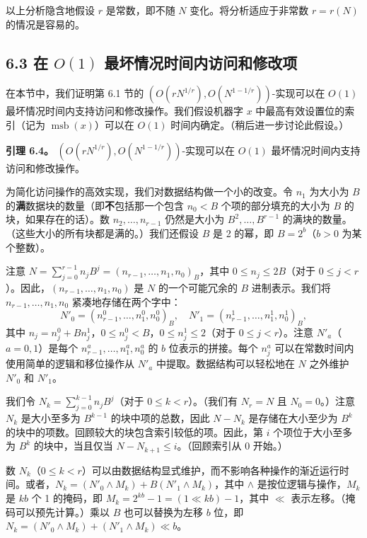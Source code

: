 \documentclass[12pt,a4paper]{ctexart}
\theoremstyle{remark}
\DeclareMathOperator{\msb}{msb}
\begin{document}
以上分析隐含地假设 $r$ 是常数，即不随 $N$ 变化。将分析适应于非常数 $r=r(N)$ 的情况是容易的。

\subsection{6.3 在 $O(1)$ 最坏情况时间内访问和修改项}

在本节中，我们证明第 6.1 节的 $(O(rN^{1/r}),O(N^{1-1/r}))$-实现可以在 $O(1)$ 最坏情况时间内支持访问和修改操作。我们假设机器字 $x$ 中最高有效设置位的索引（记为 $\msb(x)$）可以在 $O(1)$ 时间内确定。（稍后进一步讨论此假设。）

\textbf{引理 6.4。} $(O(rN^{1/r}),O(N^{1-1/r}))$-实现可以在 $O(1)$ 最坏情况时间内支持访问和修改操作。

为简化访问操作的高效实现，我们对数据结构做一个小的改变。令 $n_1$ 为大小为 $B$ 的\textbf{满}数据块的数量（即\textbf{不}包括那一个包含 $n_0<B$ 个项的部分填充的大小为 $B$ 的块，如果存在的话）。数 $n_2,\ldots,n_{r-1}$ 仍然是大小为 $B^2,\ldots,B^{r-1}$ 的满块的数量。（这些大小的所有块都是满的。）我们还假设 $B$ 是 2 的幂，即 $B=2^b$（$b>0$ 为某个整数）。

注意 $N=\sum_{j=0}^{r-1} n_j B^j = (n_{r-1},\ldots,n_1,n_0)_B$，其中 $0\leq n_j\leq 2B$（对于 $0\leq j<r$）。因此，$(n_{r-1},\ldots,n_1,n_0)$ 是 $N$ 的一个可能冗余的 $B$ 进制表示。我们将 $n_{r-1},\ldots,n_1,n_0$ 紧凑地存储在两个字中：
$$N'_0 = (n^0_{r-1},\ldots,n^0_1,n^0_0)_B, \quad N'_1 = (n^1_{r-1},\ldots,n^1_1,n^1_0)_B,$$
其中 $n_j = n^0_j + B n^1_j$，$0\leq n^0_j < B$，$0\leq n^1_j \leq 2$（对于 $0\leq j<r$）。注意 $N'_a$（$a=0,1$）是每个 $n^a_{r-1},\ldots,n^a_1,n^a_0$ 的 $b$ 位表示的拼接。每个 $n^a_j$ 可以在常数时间内使用简单的逻辑和移位操作从 $N'_a$ 中提取。数据结构可以轻松地在 $N$ 之外维护 $N'_0$ 和 $N'_1$。

我们令 $N_k = \sum_{j=0}^{k-1} n_j B^j$（对于 $0\leq k<r$）。（我们有 $N_r=N$ 且 $N_0=0$。）注意 $N_k$ 是大小至多为 $B^{k-1}$ 的块中项的总数，因此 $N-N_k$ 是存储在大小至少为 $B^k$ 的块中的项数。回顾较大的块包含索引较低的项。因此，第 $i$ 个项位于大小至多为 $B^k$ 的块中，当且仅当 $N-N_{k+1}\leq i$。（回顾索引从 0 开始。）

数 $N_k$（$0\leq k<r$）可以由数据结构显式维护，而不影响各种操作的渐近运行时间。或者，$N_k = (N'_0 \land M_k) + B(N'_1 \land M_k)$，其中 $\land$ 是按位逻辑与操作，$M_k$ 是 $kb$ 个 1 的掩码，即 $M_k = 2^{kb}-1 = (1 \ll kb)-1$，其中 $\ll$ 表示左移。（掩码可以预先计算。）乘以 $B$ 也可以替换为左移 $b$ 位，即 $N_k = (N'_0 \land M_k) + (N'_1 \land M_k) \ll b$。
\end{document}
